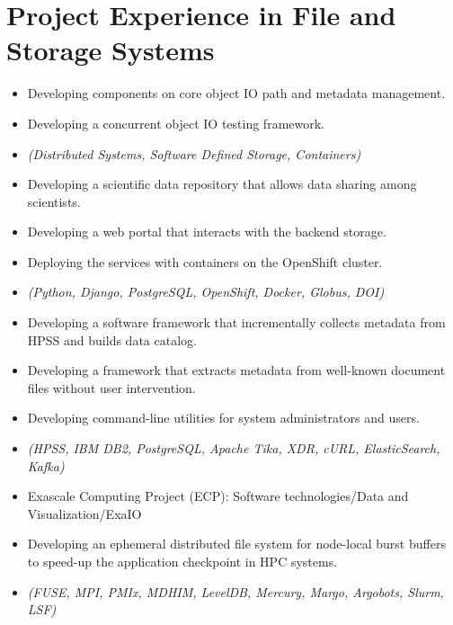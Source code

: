 \section{Project Experience in File and Storage Systems}

\begin{itemize}
    \item {Developing components on core object IO path and metadata management.}
    \item {Developing a concurrent object IO testing framework.}
    \item {\it\small(Distributed Systems, Software Defined Storage, Containers) }
\end{itemize}

\begin{itemize}
    \item {Developing a scientific data repository that allows data sharing among scientists.}
    \item {Developing a web portal that interacts with the backend storage.}
    \item {Deploying the services with containers on the OpenShift cluster.}
    \item {\it\small(Python, Django, PostgreSQL, OpenShift, Docker, Globus, DOI) }
\end{itemize}

\begin{itemize}
    \item {Developing a software framework that incrementally collects metadata from HPSS and builds data catalog.}
    \item {Developing a framework that extracts metadata from well-known document files without user intervention.}
    \item {Developing command-line utilities for system administrators and users.}
    \item {\it\small (HPSS, IBM DB2, PostgreSQL, Apache Tika, XDR, cURL, ElasticSearch, Kafka)}
\end{itemize}

\begin{itemize}
    \item {Exascale Computing Project (ECP): Software technologies/Data and Visualization/ExaIO}
    \item {Developing an ephemeral distributed file system for node-local burst buffers
           to speed-up the application checkpoint in HPC systems.}
    \item {\it\small (FUSE, MPI, PMIx, MDHIM, LevelDB, Mercury, Margo, Argobots, Slurm, LSF)}
\end{itemize}

